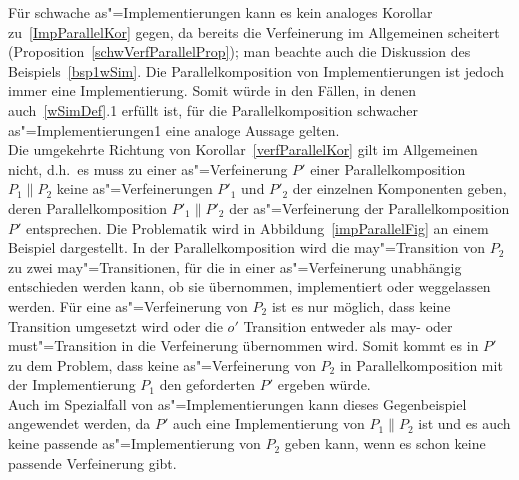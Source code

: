 Für schwache as"=Implementierungen kann es kein analoges Korollar
zu~\ref{ImpParallelKor} gegen, da bereits die Verfeinerung im Allgemeinen
scheitert (Proposition~\ref{schwVerfParallelProp}); man beachte auch die
Diskussion des Beispiels~\ref{bsp1wSim}. Die Parallelkomposition von
Implementierungen ist jedoch immer eine Implementierung. Somit würde in den
Fällen, in denen auch~\ref{wSimDef}.1 erfüllt ist, für die Parallelkomposition
schwacher as"=Implementierungen1 eine analoge Aussage gelten.\\
Die umgekehrte Richtung von Korollar~\ref{verfParallelKor} gilt im
Allgemeinen nicht, d.h.\ es muss zu einer as"=Verfeinerung $P'$ einer
Parallelkomposition $P_1\|P_2$ keine as"=Verfeinerungen $P'_1$ und $P'_2$ der
einzelnen Komponenten geben, deren Parallelkomposition $P'_1\|P'_2$ der
as"=Verfeinerung der Parallelkomposition $P'$ entsprechen. Die Problematik wird
in Abbildung~\ref{impParallelFig} an einem Beispiel dargestellt. In der
Parallelkomposition wird die may"=Transition von $P_2$ zu zwei
may"=Transitionen, für die in einer as"=Verfeinerung unabhängig entschieden
werden kann, ob sie übernommen, implementiert oder weggelassen werden. Für eine
as"=Verfeinerung von $P_2$ ist es nur möglich, dass keine Transition umgesetzt
wird oder die $o'$ Transition entweder als may- oder must"=Transition in die
Verfeinerung übernommen wird. Somit kommt es in $P'$ zu dem Problem, dass keine
as"=Verfeinerung von $P_2$ in Parallelkomposition mit der Implementierung
$P_1$ den geforderten \MEIO{} $P'$ ergeben würde.\\
Auch im Spezialfall von as"=Implementierungen kann dieses Gegenbeispiel
angewendet werden, da $P'$ auch eine Implementierung von $P_1\|P_2$ ist und es
auch keine passende as"=Implementierung von $P_2$ geben kann, wenn es schon
keine passende Verfeinerung gibt.

